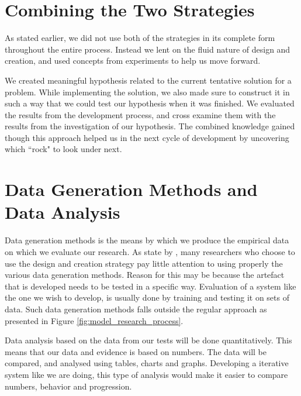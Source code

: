 \section{Combining the Two Strategies}
\label{sec:combining_the_two_strategies}
As stated earlier, we did not use both of the strategies in its complete form throughout the entire process. Instead we lent on the fluid nature of design and creation, and used concepts from experiments to help us move forward. 

We created meaningful hypothesis related to the current tentative solution for a problem. While implementing the solution, we also made sure to construct it in such a way that we could test our hypothesis when it was finished. We evaluated the results from the development process, and cross examine them with the results from the investigation of our hypothesis. The combined knowledge gained though this approach helped us in the next cycle of development by uncovering which ``rock" to look under next.


\section{Data Generation Methods and Data Analysis}
\label{sec:data_generation_methods_and_data_analysis}
Data generation methods is the means by which we produce the empirical data on which we evaluate our research. As state by \citep{oates2005researching}, many researchers who choose to use the design and creation strategy pay little attention to using properly the various data generation methods. Reason for this may be because the artefact that is developed needs to be tested in a specific way. Evaluation of a system like the one we wish to develop, is usually done by training and testing it on sets of data. Such data generation methods falls outside the regular approach as presented in Figure \ref{fig:model_research_process}.

Data analysis based on the data from our tests will be done quantitatively. This means that our data and evidence is based on numbers. The data will be compared, and analysed using tables, charts and graphs. Developing a iterative system like we are doing, this type of analysis would make it easier to compare numbers, behavior and progression.